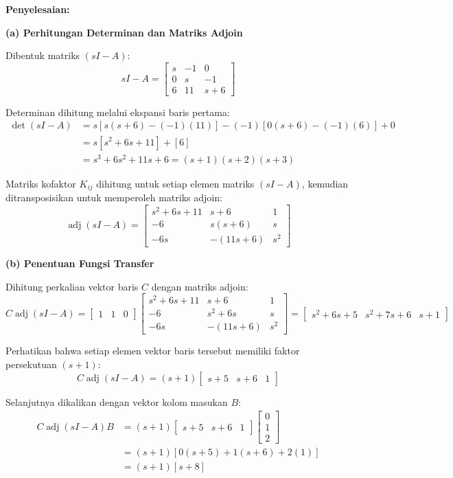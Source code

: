 \documentclass[11pt,a4paper]{article}
\begin{document}
\textbf{Penyelesaian:}

\textbf{(a) Perhitungan Determinan dan Matriks Adjoin}

Dibentuk matriks $(sI - A)$:
$$sI - A = \begin{bmatrix} s & -1 & 0 \\ 0 & s & -1 \\ 6 & 11 & s+6 \end{bmatrix}$$

Determinan dihitung melalui ekspansi baris pertama:
\begin{align*}
    \det(sI - A) &= s [s(s+6) - (-1)(11)] - (-1) [0(s+6) - (-1)(6)] + 0 \\
    &= s [s^2 + 6s + 11] + [6] \\
    &= s^3 + 6s^2 + 11s + 6 = (s+1)(s+2)(s+3)
\end{align*}

Matriks kofaktor $K_{ij}$ dihitung untuk setiap elemen matriks $(sI - A)$, kemudian ditransposisikan untuk memperoleh matriks adjoin:
$$\operatorname{adj}(sI - A) = \begin{bmatrix} s^2+6s+11 & s+6 & 1 \\ -6 & s(s+6) & s \\ -6s & -(11s+6) & s^2 \end{bmatrix}$$

\textbf{(b) Penentuan Fungsi Transfer}

Dihitung perkalian vektor baris $C$ dengan matriks adjoin:
$$C \operatorname{adj}(sI - A) = \begin{bmatrix} 1 & 1 & 0 \end{bmatrix} \begin{bmatrix} s^2+6s+11 & s+6 & 1 \\ -6 & s^2+6s & s \\ -6s & -(11s+6) & s^2 \end{bmatrix} = \begin{bmatrix} s^2+6s+5 & s^2+7s+6 & s+1 \end{bmatrix}$$

Perhatikan bahwa setiap elemen vektor baris tersebut memiliki faktor persekutuan $(s+1)$:
$$C \operatorname{adj}(sI - A) = (s+1) \begin{bmatrix} s+5 & s+6 & 1 \end{bmatrix}$$

Selanjutnya dikalikan dengan vektor kolom masukan $B$:
\begin{align*}
    C \operatorname{adj}(sI - A) B &= (s+1) \begin{bmatrix} s+5 & s+6 & 1 \end{bmatrix} \begin{bmatrix} 0 \\ 1 \\ 2 \end{bmatrix} \\
    &= (s+1) [0(s+5) + 1(s+6) + 2(1)] \\
    &= (s+1) [s + 8]
\end{align*}
\end{document}
